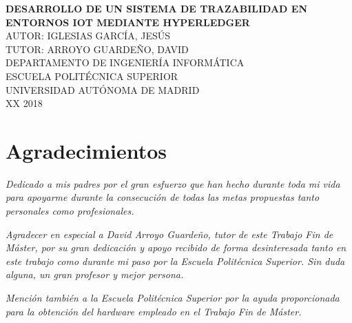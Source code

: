 \documentclass[12pt,a4paper, twoside]{report}
\newcommand{\university}{UNIVERSIDAD AUTÓNOMA DE MADRID}
\newcommand{\faculty}{ESCUELA POLITÉCNICA SUPERIOR}
\newcommand{\dpto}{DEPARTAMENTO DE INGENIERÍA INFORMÁTICA}
\newcommand{\titleTFM}{DESARROLLO DE UN SISTEMA DE TRAZABILIDAD EN ENTORNOS IOT MEDIANTE HYPERLEDGER}
\newcommand{\jesus}{IGLESIAS GARCÍA, JESÚS}
\newcommand{\david}{ARROYO GUARDEÑO, DAVID}
\newcommand{\blankpage}{
				\newpage
				\thispagestyle{empty}
				\mbox{}
				\newpage
				}
\begin{document}
	\begin{titlepage}
		\begin{center}
			\vspace*{1.5in}	
			
			\large{\textbf{\titleTFM}} \\
			\vspace*{0.8in}
			\normalsize{AUTOR:} \normalsize{\jesus}  \\
			\vspace*{0.05in}
			\normalsize{TUTOR:} \normalsize{\david} \\
			\vspace*{0.8in}
			\small{\textsc{\dpto}}\\
			\vspace*{0.02in}
			\small{\textsc{\faculty}}\\
			\vspace*{0.02in}
			\small{\textsc{\university}}\\	
			\vspace*{0.02in}
			\small{{\color{red}XX} 2018} \\
		\end{center}
	\end{titlepage}
	
	\blankpage
	
	\chapter*{Agradecimientos}
	\thispagestyle{empty}
	\vspace{1cm}
	\begin{flushright}
			\textit{Dedicado a mis padres por el gran esfuerzo que han hecho durante toda mi vida para apoyarme durante la consecución de todas las metas propuestas tanto personales como profesionales.} 
			
		\vspace{1cm}	
		
			\textit{Agradecer en especial a David Arroyo Guardeño, tutor de este Trabajo Fin de Máster, por su gran dedicación y apoyo recibido de forma desinteresada tanto en este trabajo como durante mi paso por la Escuela Politécnica Superior. Sin duda alguna, un gran profesor y mejor persona.}
			
		\vspace{1cm}	
		
		\textit{Mención también a la Escuela Politécnica Superior por la ayuda proporcionada para la obtención del hardware empleado en el Trabajo Fin de Máster.}
	\end{flushright}
	
\end{document}
